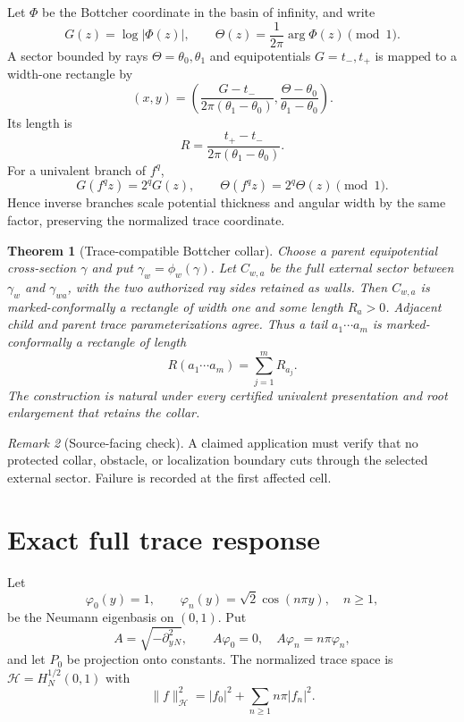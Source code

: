 \documentclass[10pt]{article}
\newtheorem{theorem}{Theorem}[section]
\theoremstyle{definition}
\theoremstyle{remark}
\newtheorem{remark}[theorem]{Remark}
\begin{document}
Let $\Phi$ be the Bottcher coordinate in the basin of infinity, and write
\[
 G(z)=\log|\Phi(z)|,\qquad
 \Theta(z)=\frac{1}{2\pi}\arg\Phi(z)\pmod1.
\]
A sector bounded by rays $\Theta=\theta_0,\theta_1$ and equipotentials
$G=t_-,t_+$ is mapped to a width-one rectangle by
\[
 (x,y)=\left(
 \frac{G-t_-}{2\pi(\theta_1-\theta_0)},
 \frac{\Theta-\theta_0}{\theta_1-\theta_0}
 \right).
\]
Its length is
\[
 R=\frac{t_+-t_-}{2\pi(\theta_1-\theta_0)}.
\tag{2.1}
\]
For a univalent branch of $f^q$,
\[
 G(f^qz)=2^qG(z),\qquad
 \Theta(f^qz)=2^q\Theta(z)\pmod1.
\tag{2.2}
\]
Hence inverse branches scale potential thickness and angular width by the same
factor, preserving the normalized trace coordinate.

\begin{theorem}[Trace-compatible Bottcher collar]
Choose a parent equipotential cross-section $\gamma$ and put
$\gamma_w=\phi_w(\gamma)$. Let $C_{w,a}$ be the full external sector between
$\gamma_w$ and $\gamma_{wa}$, with the two authorized ray sides retained as
walls. Then $C_{w,a}$ is marked-conformally a rectangle of width one and some
length $R_a>0$. Adjacent child and parent trace parameterizations agree. Thus a
tail $a_1\cdots a_m$ is marked-conformally a rectangle of length
\[
 R(a_1\cdots a_m)=\sum_{j=1}^mR_{a_j}.
\tag{2.3}
\]
The construction is natural under every certified univalent presentation and
root enlargement that retains the collar.
\end{theorem}

\begin{remark}[Source-facing check]
A claimed application must verify that no protected collar, obstacle, or
localization boundary cuts through the selected external sector. Failure is
recorded at the first affected cell.
\end{remark}

\section{Exact full trace response}

Let
\[
 \varphi_0(y)=1,\qquad
 \varphi_n(y)=\sqrt2\cos(n\pi y),\quad n\ge1,
\]
be the Neumann eigenbasis on $(0,1)$. Put
\[
 A=\sqrt{-\partial_y^2{}_N},\qquad
 A\varphi_0=0,\quad A\varphi_n=n\pi\varphi_n,
\tag{3.1}
\]
and let $P_0$ be projection onto constants. The normalized trace space is
$\mathcal H=H^{1/2}_N(0,1)$ with
\[
 \|f\|_{\mathcal H}^2=|f_0|^2+\sum_{n\ge1}n\pi|f_n|^2.
\tag{3.2}
\]
\end{document}
